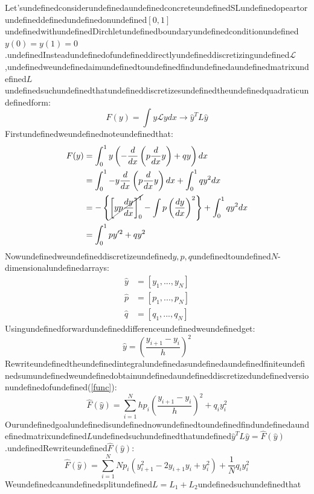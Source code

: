 Let'sundefinedconsiderundefinedaundefinedconcreteundefinedSLundefinedopeartorundefineddefinedundefinedonundefined$[0,1]$undefinedwithundefinedDirchletundefinedboundaryundefinedconditionundefined$y(0)=y(1)=0$.undefinedInsteadundefinedofundefineddirectlyundefineddiscretizingundefined$\mathcal L$,undefinedweundefinedaimundefinedtoundefinedfindundefinedaundefinedmatrixundefined$L$undefinedsuchundefinedthatundefineddiscretizesundefinedtheundefinedquadraticundefinedform:
\begin{equation}
F(y)=\int y\mathcal Ly dx \rightarrow \hat y^TL\hat y
\end{equation}
Firstundefinedweundefinednoteundefinedthat:
\begin{equation}
\label{func}
\begin{aligned}
F(y) &= \int_0^1 y\left(-\frac{d}{dx}\left(p\frac{d}{dx}y\right) + qy\right) dx \\
&= \int_0^1 -y \frac{d}{dx}\left(p\frac{d}{dx}y\right)dx+\int_0^1 qy^2dx  \\
&= -\left\{\cancel{\left[yp\frac{dy}{dx}\right]_0^1} - \int p\left(\frac{dy}{dx}\right)^2 \right\} + \int_0^1 qy^2dx \\
&= \int_0^1 py'^2 + qy^2
\end{aligned}
\end{equation}
Nowundefinedweundefineddiscretizeundefined$y, p, q$undefinedtoundefined$N$-dimensionalundefinedarrays:
\begin{equation}
\begin{aligned}
\hat y &= [y_1,...,y_N] \\
\hat p &= [p_1,...,p_N] \\
\hat q &= [q_1,...,q_N]
\end{aligned}
\end{equation}
Usingundefinedforwardundefineddifferenceundefinedweundefinedget:
\begin{equation}
\hat y =\left(\frac{y_{i+1}-y_i}{h}\right)^2
\end{equation}
Rewriteundefinedtheundefinedintegralundefinedasundefinedaundefinedfiniteundefinedsumundefinedweundefinedobtainundefinedaundefineddiscretizedundefinedversionundefinedofundefined(\ref{func}):
\begin{equation}
\boxed{\hat F(\hat y)=\sum_{i=1}^N h p_i\left(\frac{y_{i+1}-y_i}{h}\right)^2 +q_iy_i^2}
\end{equation}
Ourundefinedgoalundefinedisundefinednowundefinedtoundefinedfindundefinedaundefinedmatrixundefined$L$undefinedsuchundefinedthatundefined$\hat y^TL\hat y=\hat F(\hat y)$.undefinedRewriteundefined$\hat F(\hat y)$:
\begin{equation}
\hat F(\hat y) =\sum_{i=1}^N Np_i(y_{i+1}^2 -2y_{i+1}y_i +y_i^2)+\frac{1}{N}q_iy_i^2
\end{equation}
Weundefinedcanundefinedsplitundefined$L=L_1+L_2$undefinedsuchundefinedthat

